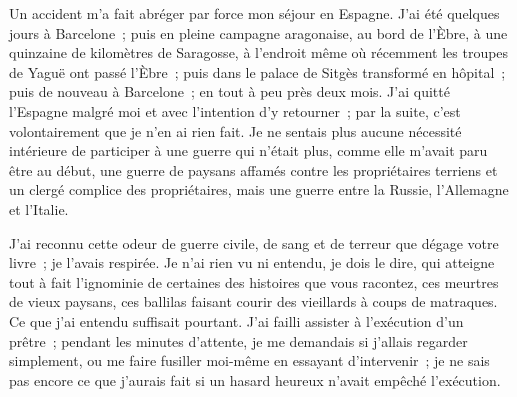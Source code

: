 \documentclass[french,twoside]{book} %
\begin{document}
Un accident m'a fait abréger par force mon séjour en Espagne. J'ai été quelques jours à Barcelone ; puis en pleine campagne aragonaise, au bord de l'Èbre, à une quinzaine de kilomètres de Saragosse, à l'endroit même où récemment les troupes de Yaguë ont passé l'Èbre ; puis dans le palace de Sitgès transformé en hôpital ; puis de nouveau à Barcelone ; en tout à peu près deux mois. J'ai quitté l'Espagne malgré moi et avec l'intention d'y retourner ; par la suite, c'est volontairement que je n'en ai rien fait. Je ne sentais plus aucune nécessité intérieure de participer à une guerre qui n'était plus, comme elle m'avait paru être au début, une guerre de paysans affamés contre les propriétaires terriens et un clergé complice des propriétaires, mais une guerre entre la Russie, l'Allemagne et l'Italie.\par
J'ai reconnu cette odeur de guerre civile, de sang et de terreur que dégage votre livre ; je l'avais respirée. Je n'ai rien vu ni entendu, je dois le dire, qui atteigne tout à fait l'ignominie de certaines des histoires que vous racontez, ces meurtres de vieux paysans, ces ballilas faisant courir des vieillards à coups de matraques. Ce que j'ai entendu suffisait pourtant. J'ai failli assister à l'exécu­tion d'un prêtre ; pendant les minutes d'attente, je me demandais si j'allais regarder simplement, ou me faire fusiller moi-même en essayant d'intervenir ; je ne sais pas encore ce que j'aurais fait si un hasard heureux n'avait empêché l'exécution.\par
\end{document}
